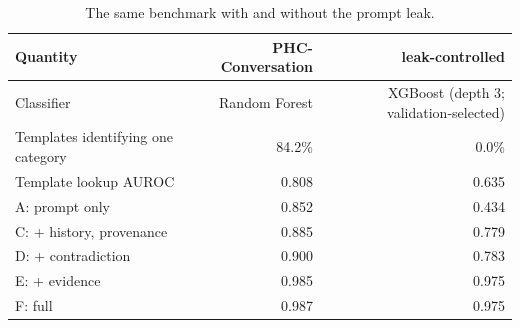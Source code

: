 \begin{table}[t]
\centering
\caption{The same benchmark with and without the prompt leak.}
\label{tab:leakcontrol}
\small
\begin{tabular}{lrr}
\toprule
Quantity & PHC-Conversation & leak-controlled \\
\midrule
Classifier & Random Forest & XGBoost (depth 3; validation-selected) \\
Templates identifying one category & 84.2\% & 0.0\% \\
Template lookup AUROC & 0.808 & 0.635 \\
A: prompt only & 0.852 & 0.434 \\
C: + history, provenance & 0.885 & 0.779 \\
D: + contradiction & 0.900 & 0.783 \\
E: + evidence & 0.985 & 0.975 \\
F: full & 0.987 & 0.975 \\
\bottomrule
\end{tabular}
\end{table}
